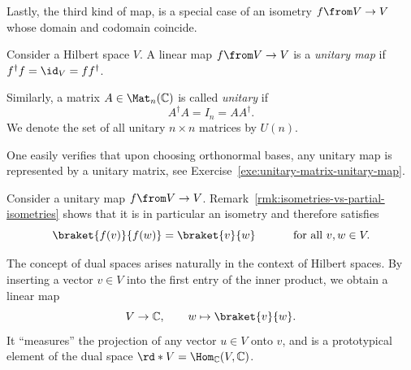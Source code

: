 \documentclass[a4paper,oneside, 12pt]{amsart}
\begin{document}
Lastly, the third kind of map, is a special case of an isometry \(f\from V\to V\)  whose domain and codomain coincide.

\begin{definition}\label{def:unitary-matrix}
  Consider a Hilbert space \(V\).
  A linear map \(f \from V \to V\) is a \emph{unitary map} if \(f^{\dagger} f = \id_{V} = f f^{\dagger}\).


  Similarly, a matrix \( A \in \Mat_n(\mathbb{C}) \) is called \emph{unitary} if
  \begin{equation}
    A^\dagger A = I_n = A A^\dagger.
  \end{equation}
  We denote the set of all unitary \( n \times n \) matrices by \( U(n) \).
\end{definition}
One easily verifies that upon choosing orthonormal bases, any unitary map is represented by a unitary matrix, see Exercise~\ref{exe:unitary-matrix-unitary-map}.

\begin{remark}\label{rmk:unitaries-are-isometrics}
  Consider a unitary map \(f \from V\to V\). Remark~\ref{rmk:isometries-vs-partial-isometries} shows that it is in particular an isometry and therefore satisfies
  \begin{equation*}
    \braket{f(v)}{f(w)} = \braket{v}{w} \qquad\quad \text{ for all } v,w \in V.
  \end{equation*}
\end{remark}

The concept of dual spaces arises naturally in the context of Hilbert spaces.
By inserting a vector \( v \in V \) into the first entry of the inner product, we obtain a linear map
\begin{equation*}
    V \to \mathbb{C}, \qquad w \mapsto \braket{v}{w} .
\end{equation*}
It ``measures'' the projection of any vector \( u \in V \) onto \( v \), and is a prototypical element of the dual space \( \rd*{V}= \Hom_{ \mathbb{C}}(V, \mathbb{C})\).
\end{document}
